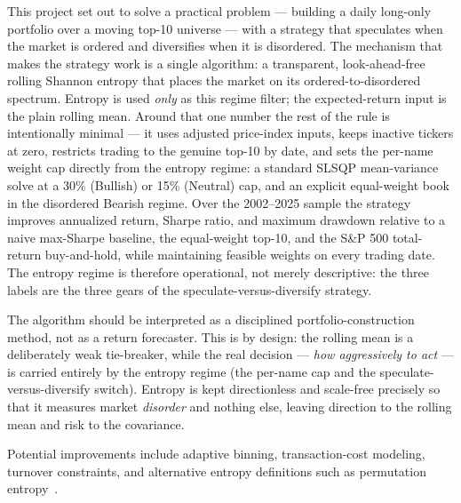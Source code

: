 \documentclass[a4paper,12pt]{article}
\begin{document}
This project set out to solve a practical problem --- building a daily long-only portfolio over a moving top-10 universe --- with a strategy that speculates when the market is ordered and diversifies when it is disordered. The mechanism that makes the strategy work is a single algorithm: a transparent, look-ahead-free rolling Shannon entropy that places the market on its ordered-to-disordered spectrum. Entropy is used \emph{only} as this regime filter; the expected-return input is the plain rolling mean. Around that one number the rest of the rule is intentionally minimal --- it uses adjusted price-index inputs, keeps inactive tickers at zero, restricts trading to the genuine top-10 by date, and sets the per-name weight cap directly from the entropy regime: a standard SLSQP mean-variance solve at a 30\% (Bullish) or 15\% (Neutral) cap, and an explicit equal-weight book in the disordered Bearish regime. Over the 2002--2025 sample the strategy improves annualized return, Sharpe ratio, and maximum drawdown relative to a naive max-Sharpe baseline, the equal-weight top-10, and the S\&P 500 total-return buy-and-hold, while maintaining feasible weights on every trading date. The entropy regime is therefore operational, not merely descriptive: the three labels are the three gears of the speculate-versus-diversify strategy.

The algorithm should be interpreted as a disciplined portfolio-construction method, not as a return forecaster. This is by design: the rolling mean is a deliberately weak tie-breaker, while the real decision --- \emph{how aggressively to act} --- is carried entirely by the entropy regime (the per-name cap and the speculate-versus-diversify switch). Entropy is kept directionless and scale-free precisely so that it measures market \emph{disorder} and nothing else, leaving direction to the rolling mean and risk to the covariance.

Potential improvements include adaptive binning, transaction-cost modeling, turnover constraints, and alternative entropy definitions such as permutation entropy~\cite{bandt}.
\end{document}

